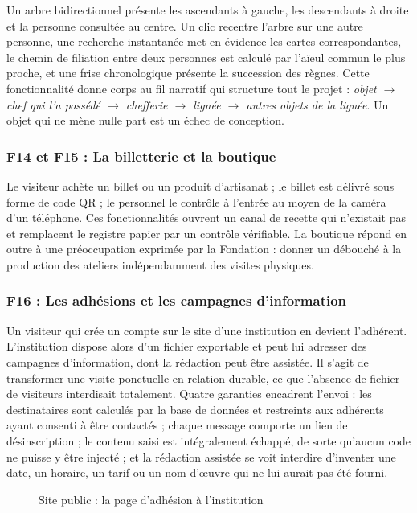 Un arbre bidirectionnel présente les ascendants à gauche, les descendants à
droite et la personne consultée au centre. Un clic recentre l'arbre sur une
autre personne, une recherche instantanée met en évidence les cartes
correspondantes, le chemin de filiation entre deux personnes est calculé par
l'aïeul commun le plus proche, et une frise chronologique présente la succession
des règnes. Cette fonctionnalité donne corps au fil narratif qui structure tout
le projet : \emph{objet $\rightarrow$ chef qui l'a possédé $\rightarrow$
chefferie $\rightarrow$ lignée $\rightarrow$ autres objets de la lignée}. Un
objet qui ne mène nulle part est un échec de conception.

\subsubsection{F14 et F15 : La billetterie et la boutique}

Le visiteur achète un billet ou un produit d'artisanat ; le billet est délivré
sous forme de code QR ; le personnel le contrôle à l'entrée au moyen de la
caméra d'un téléphone. Ces fonctionnalités ouvrent un canal de recette qui
n'existait pas et remplacent le registre papier par un contrôle vérifiable. La
boutique répond en outre à une préoccupation exprimée par la Fondation : donner
un débouché à la production des ateliers indépendamment des visites physiques.

\subsubsection{F16 : Les adhésions et les campagnes d'information}

Un visiteur qui crée un compte sur le site d'une institution en devient
l'adhérent. L'institution dispose alors d'un fichier exportable et peut lui
adresser des campagnes d'information, dont la rédaction peut être assistée. Il
s'agit de transformer une visite ponctuelle en relation durable, ce que
l'absence de fichier de visiteurs interdisait totalement. Quatre garanties
encadrent l'envoi : les destinataires sont calculés par la base de données et
restreints aux adhérents ayant consenti à être contactés ; chaque message
comporte un lien de désinscription ; le contenu saisi est intégralement échappé,
de sorte qu'aucun code ne puisse y être injecté ; et la rédaction assistée se
voit interdire d'inventer une date, un horaire, un tarif ou un nom d'œuvre qui
ne lui aurait pas été fourni.

\begin{figure}[htbp]
\centering
{}
\caption{Site public : la page d'adhésion à l'institution}
\label{fig:cap-adhesion}
\end{figure}

